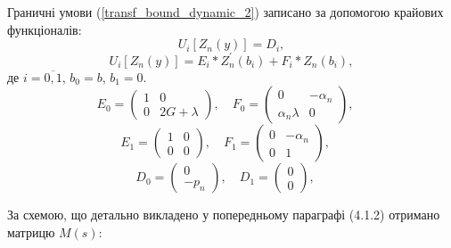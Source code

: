 Граничні умови (\ref{transf_bound_dynamic_2}) записано за допомогою крайових функціоналів:
\begin{equation}\label{transf_bound_mat_dynamic_2}
    U_i\left[ Z_n(y) \right] = D_i,
\end{equation}
\begin{equation}
    U_i\left[ Z_n(y) \right] = E_i * Z_n^{'}(b_i) + F_i * Z_n(b_i),
\end{equation}
де $i = \overline{0, 1}$, $b_0 = b$, $b_1 = 0$.
\begin{equation*}
    E_0 = \begin{pmatrix}
        1 & 0 \\
        0 & 2G + \lambda
    \end{pmatrix}, \quad
    F_0 = \begin{pmatrix}
        0 & -\alpha_n \\
        \alpha_n \lambda & 0
    \end{pmatrix}, \quad
\end{equation*}
\begin{equation*}
    E_1 = \begin{pmatrix}
        1 & 0 \\
        0 & 0
    \end{pmatrix}, \quad
    F_1 = \begin{pmatrix}
        0 & -\alpha_n \\
        0 & 1
    \end{pmatrix}, \quad
\end{equation*}
\begin{equation*}
    D_0 = \begin{pmatrix}
        0 \\
        -p_n
    \end{pmatrix}, \quad
    D_1 = \begin{pmatrix}
        0 \\
        0
    \end{pmatrix}, \quad
\end{equation*}

За схемою, що детально викладено у попередньому параграфі (4.1.2) отримано матрицю $M(s)$:


